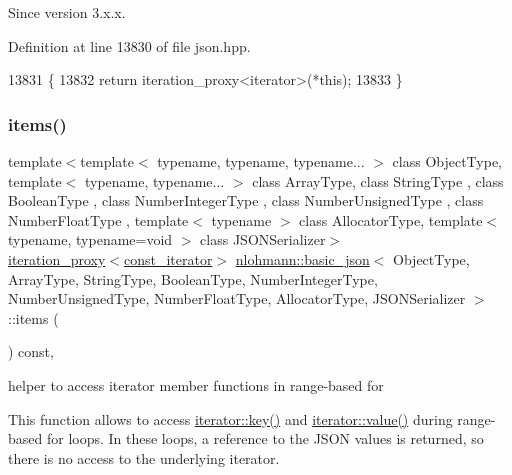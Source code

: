 \begin{DoxySince}{Since}
version 3.\+x.\+x. 
\end{DoxySince}


Definition at line 13830 of file json.\+hpp.


\begin{DoxyCode}
13831     \{
13832         \textcolor{keywordflow}{return} iteration\_proxy<iterator>(*this);
13833     \}
\end{DoxyCode}
\mbox{\label{classnlohmann_1_1basic__json_a71dd7adfca43660c10e6624f4b5c290c}} 
\subsubsection{\texorpdfstring{items()}{items()}\hspace{0.1cm}{\footnotesize\ttfamily [2/2]}}
{\footnotesize\ttfamily template$<$template$<$ typename, typename, typename... $>$ class Object\+Type, template$<$ typename, typename... $>$ class Array\+Type, class String\+Type , class Boolean\+Type , class Number\+Integer\+Type , class Number\+Unsigned\+Type , class Number\+Float\+Type , template$<$ typename $>$ class Allocator\+Type, template$<$ typename, typename=void $>$ class J\+S\+O\+N\+Serializer$>$ \\
\hyperlink{classnlohmann_1_1basic__json_afb49d897bc58d6678f4471925bbfbb01}{iteration\+\_\+proxy}$<$\hyperlink{classnlohmann_1_1basic__json_a41a70cf9993951836d129bb1c2b3126a}{const\+\_\+iterator}$>$ \hyperlink{classnlohmann_1_1basic__json}{nlohmann\+::basic\+\_\+json}$<$ Object\+Type, Array\+Type, String\+Type, Boolean\+Type, Number\+Integer\+Type, Number\+Unsigned\+Type, Number\+Float\+Type, Allocator\+Type, J\+S\+O\+N\+Serializer $>$\+::items (\begin{DoxyParamCaption}{ }\end{DoxyParamCaption}) const\hspace{0.3cm}{\ttfamily [inline]}, {\ttfamily [noexcept]}}



helper to access iterator member functions in range-\/based for 

This function allows to access \hyperlink{classnlohmann_1_1detail_1_1iter__impl_a3a541a223320f6635f2f188ba54f8818}{iterator\+::key()} and \hyperlink{classnlohmann_1_1detail_1_1iter__impl_ab447c50354c6611fa2ae0100ac17845c}{iterator\+::value()} during range-\/based for loops. In these loops, a reference to the J\+S\+ON values is returned, so there is no access to the underlying iterator.

